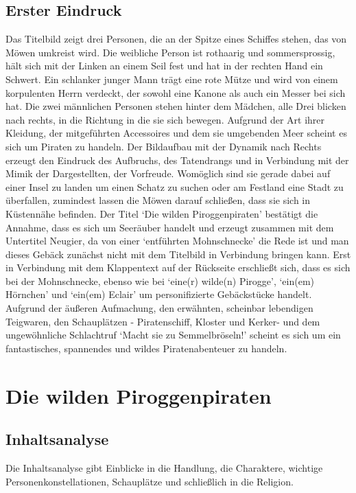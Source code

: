 \section{Erster Eindruck}
Das Titelbild zeigt drei Personen, die an der Spitze eines Schiffes stehen, das von Möwen umkreist wird. Die weibliche Person ist rothaarig und sommersprossig, hält sich mit der Linken an einem Seil fest und hat in der rechten Hand ein Schwert. Ein schlanker junger Mann trägt eine rote Mütze und wird von einem korpulenten Herrn verdeckt, der sowohl eine Kanone als auch ein Messer bei sich hat. Die zwei männlichen Personen stehen hinter dem Mädchen, alle Drei blicken nach rechts, in die Richtung in die sie sich bewegen. Aufgrund der Art ihrer Kleidung, der mitgeführten Accessoires und dem sie umgebenden Meer scheint es sich um Piraten zu handeln. Der Bildaufbau mit der Dynamik nach Rechts erzeugt den Eindruck des Aufbruchs, des Tatendrangs und in Verbindung mit der Mimik der Dargestellten, der Vorfreude. Womöglich sind sie gerade dabei auf einer Insel zu landen um einen Schatz zu suchen oder am Festland eine Stadt zu überfallen, zumindest lassen die Möwen darauf schließen, dass sie sich in Küstennähe befinden.
Der Titel `Die wilden Piroggenpiraten' bestätigt die Annahme, dass es sich um Seeräuber handelt und erzeugt zusammen mit dem Untertitel Neugier, da von einer `entführten Mohnschnecke' die Rede ist und man dieses Gebäck zunächst nicht mit dem Titelbild in Verbindung bringen kann. Erst in Verbindung mit dem Klappentext auf der Rückseite erschließt sich, dass es sich bei der Mohnschnecke, ebenso wie bei `eine(r) wilde(n) Pirogge', `ein(em) Hörnchen' und `ein(em) Eclair' um personifizierte Gebäckstücke handelt. Aufgrund der äußeren Aufmachung, den erwähnten, scheinbar lebendigen Teigwaren, den Schauplätzen - Piratenschiff, Kloster und Kerker- und dem ungewöhnliche Schlachtruf `Macht sie zu Semmelbröseln!' scheint es sich um ein fantastisches, spannendes und wildes Piratenabenteuer zu handeln.

\chapter{Die wilden Piroggenpiraten}

\section{Inhaltsanalyse}
Die Inhaltsanalyse gibt Einblicke in die Handlung, die Charaktere, wichtige Personenkonstellationen, Schauplätze und schließlich in die Religion.

